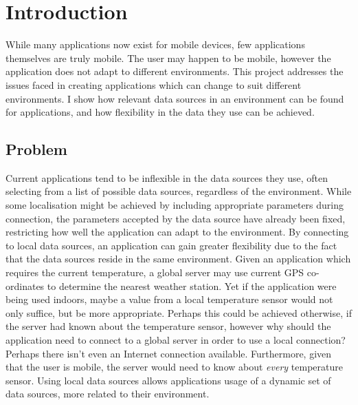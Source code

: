\documentclass[12pt,twoside,notitlepage]{report}
\begin{document}
\bigskip
{}

\cleardoublepage

\tableofcontents

\listoffigures

\newpage


\cleardoublepage        %

\setcounter{page}{1}
\pagestyle{headings}

\chapter{Introduction}

While many applications now exist for mobile devices, few applications themselves are truly mobile. 
The user may happen to be mobile, however the application does not adapt to different environments. 
This project addresses the issues faced in creating applications which can change to suit different environments. 
I show how relevant data sources in an environment can be found for applications, and how flexibility in the data they use can be achieved. 

\section{Problem}

Current applications tend to be inflexible in the data sources they use, often selecting from a list of possible data sources, regardless of the environment. 
While some localisation might be achieved by including appropriate parameters during connection, the parameters accepted by the data source have already been fixed, restricting how well the application can adapt to the environment. 
By connecting to local data sources, an application can gain greater flexibility due to the fact that the data sources reside in the same environment.
Given an application which requires the current temperature, a global server may use current GPS co-ordinates to determine the nearest weather station. 
Yet if the application were being used indoors, maybe a value from a local temperature sensor would not only suffice, but be more appropriate. 
Perhaps this could be achieved otherwise, if the server had known about the temperature sensor, however why should the application need to connect to a global server in order to use a local connection? Perhaps there isn't even an Internet connection available. 
Furthermore, given that the user is mobile, the server would need to know about {\sl every} temperature sensor. 
Using local data sources allows applications usage of a dynamic set of data sources, more related to their environment.
\end{document}
